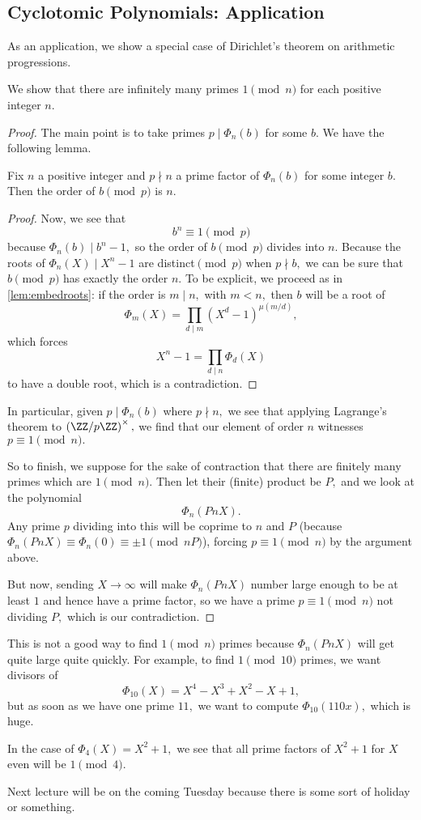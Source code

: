 \subsection{Cyclotomic Polynomials: Application}
As an application, we show a special case of Dirichlet's theorem on arithmetic progressions.
\begin{exe}
	We show that there are infinitely many primes $1\pmod n$ for each positive integer $n.$
\end{exe}
\begin{proof}
	The main point is to take primes $p\mid\Phi_n(b)$ for some $b.$ We have the following lemma.
	\begin{lemma}
		Fix $n$ a positive integer and $p\nmid n$ a prime factor of $\Phi_n(b)$ for some integer $b.$ Then the order of $b\pmod p$ is $n.$
	\end{lemma}
	\begin{proof}
		Now, we see that
		\[b^n\equiv1\pmod p\]
		because $\Phi_n(b)\mid b^n-1,$ so the order of $b\pmod p$ divides into $n.$ Because the roots of $\Phi_n(X)\mid X^n-1$ are distinct$\pmod p$ when $p\nmid b,$ we can be sure that $b\pmod p$ has exactly the order $n.$ To be explicit, we proceed as in \autoref{lem:embedroots}: if the order is $m\mid n,$ with $m<n,$ then $b$ will be a root of
		\[\Phi_m(X)=\prod_{d\mid m}\left(X^d-1\right)^{\mu(m/d)},\]
		which forces
		\[X^n-1=\prod_{d\mid n}\Phi_d(X)\]
		to have a double root, which is a contradiction.
	\end{proof}
	In particular, given $p\mid\Phi_n(b)$ where $p\nmid n,$ we see that applying Lagrange's theorem to $\left(\ZZ/p\ZZ\right)^\times,$ we find that our element of order $n$ witnesses $p\equiv1\pmod n.$

	So to finish, we suppose for the sake of contraction that there are finitely many primes which are $1\pmod n.$ Then let their (finite) product be $P,$ and we look at the polynomial
	\[\Phi_n(PnX).\]
	Any prime $p$ dividing into this will be coprime to $n$ and $P$ (because $\Phi_n(PnX)\equiv\Phi_n(0)\equiv\pm1\pmod{nP}$), forcing $p\equiv1\pmod n$ by the argument above.
	
	But now, sending $X\to\infty$ will make $\Phi_n(PnX)$ number large enough to be at least $1$ and hence have a prime factor, so we have a prime $p\equiv1\pmod n$ not dividing $P,$ which is our contradiction.
\end{proof}
\begin{remark}
	This is not a good way to find $1\pmod n$ primes because $\Phi_n(PnX)$ will get quite large quite quickly. For example, to find $1\pmod{10}$ primes, we want divisors of
	\[\Phi_{10}(X)=X^4-X^3+X^2-X+1,\]
	but as soon as we have one prime $11,$ we want to compute $\Phi_{10}(110x),$ which is huge.
\end{remark}
\begin{example}
	In the case of $\Phi_4(X)=X^2+1,$ we see that all prime factors of $X^2+1$ for $X$ even will be $1\pmod4.$
\end{example}
Next lecture will be on the coming Tuesday because there is some sort of holiday or something.